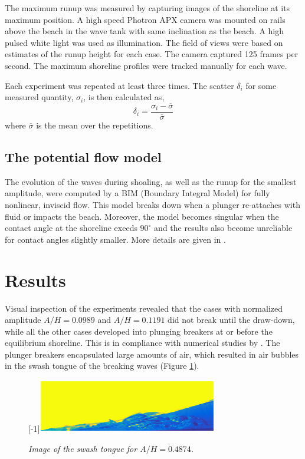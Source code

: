 \documentclass[a4paper, 11pt, english, twoside, openright]{article}
\begin{document}
The maximum runup was measured by capturing images of the shoreline at its maximum position. A high speed Photron APX  camera was mounted on rails above the beach in the wave tank with same inclination as the beach. A high pulsed white light was used as illumination. The field of views were based on estimates of the runup height for each case. The camera captured 125 frames per second. The maximum shoreline profiles were tracked manually for each wave.


Each experiment was repeated at least three times.
The scatter $\delta_i$ for some measured quantity, $\sigma_i$, is then calculated as,
\begin{equation}
\delta_i=\frac{\sigma_i-\overline{\sigma}}{\overline{\sigma}}
\end{equation}
where $\overline{\sigma}$ is the mean over the  repetitions.

\subsection{The potential flow model}
The evolution of the waves during shoaling, as well as the runup for the smallest amplitude, were 
computed by a BIM (Boundary Integral Model) for fully nonlinear, inviscid flow.
This model breaks down when a plunger re-attaches with fluid or impacts the beach. Moreover, the
model  becomes
singular when the contact angle at the shoreline exeeds $90^\circ$  and the results also become unreliable
for contact angles slightly smaller.  More details are given in  \cite{pedersen2013runup}.    
\section{Results}
\label{result}

Visual inspection of the experiments revealed that the cases with normalized amplitude $A/H=0.0989$ and $A/H=0.1191$ did not break until the draw-down, while all the other cases developed into plunging breakers at or before the equilibrium shoreline. This is in compliance with numerical studies by \cite{grilli1997breaking}. The plunger breakers encapsulated large amounts of air, which resulted in air bubbles in the swash tongue of the breaking waves (Figure \ref{fig:boble_bevis}).

\begin{figure}[]
\centering
\scalebox{1}[-1]{\includegraphics[angle=180,width=0.7\textwidth]{./Figures/BUBBLE/new_jan_bilde_bub.eps}}
\caption{\textit{Image of the swash tongue for $A/H=0.4874$. }}
\label{fig:boble_bevis}
\end{figure}
\end{document}
